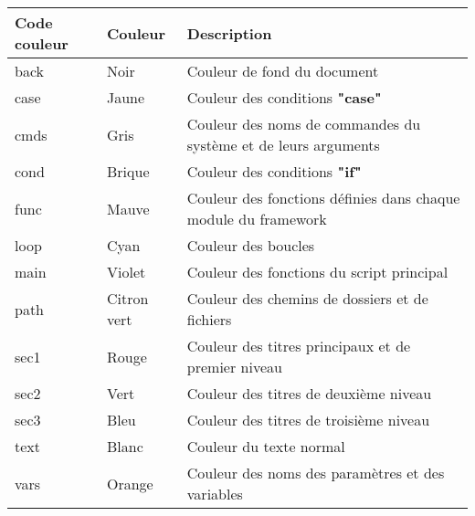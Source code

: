 \documentclass[a4paper,10pt]{article}
\begin{document}
\begin{justify}
    \begin{tabular}{|l|l|l|}
        \hline
        \textbf{Code couleur} & \textbf{Couleur}    & \textbf{Description}\\
        \hline
        \color{text}back  & \color{text}Noir        & \color{text}Couleur de fond du document\\
        \hline
        \color{case}case  & \color{case}Jaune       & \color{case}Couleur des conditions \textbf{"case"}\\
        \hline
        \color{cmds}cmds  & \color{cmds}Gris        & \color{cmds}Couleur des noms de commandes du système et de leurs arguments\\
        \hline
        \color{cond}cond  & \color{cond}Brique      & \color{cond}Couleur des conditions \textbf{"if"}\\
        \hline
        \color{func}func  & \color{func}Mauve       & \color{func}Couleur des fonctions définies dans chaque module du framework\\
        \hline
        \color{loop}loop  & \color{loop}Cyan        & \color{loop}Couleur des boucles\\
        \hline
        \color{main}main  & \color{main}Violet      & \color{main}Couleur des fonctions du script principal\\
        \hline
        \color{path}path  & \color{path}Citron vert & \color{path}Couleur des chemins de dossiers et de fichiers\\
        \hline
        \color{sec1}sec1  & \color{sec1}Rouge       & \color{sec1}Couleur des titres principaux et de premier niveau\\
        \hline
        \color{sec2}sec2  & \color{sec2}Vert        & \color{sec2}Couleur des titres de deuxième niveau\\
        \hline
        \color{sec3}sec3  & \color{sec3}Bleu        & \color{sec3}Couleur des titres de troisième niveau\\
        \hline
        \color{text}text  & \color{text}Blanc       & \color{text}Couleur du texte normal\\
        \hline
        \color{vars}vars  & \color{vars}Orange      & \color{vars}Couleur des noms des paramètres et des variables\\
        \hline

    \end{tabular}
\end{justify}
\end{document}
